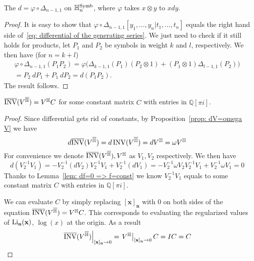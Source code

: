 \begin{lemma}\label{lem: differential = Delta_{d-1,1}} The $d=\varphi\circ\Delta_{n-1,1}$ on $\mathbb H^{\operatorname{Symb}}_n$, where $\varphi$ takes $x\otimes y$ to $xdy$.
\end{lemma}

\begin{proof} It is easy to show that $\varphi\circ\Delta_{n-1,1}[y_1,\dots,y_n|t_1,\dots,t_n]$ equals the right hand side of~\eqref{eq: differential of the generating series}. We just need to check if it still holds for products, let $P_1$ and $P_2$ be symbols in weight  $k$ and $l$, respectively. We then have (for $n=k+l$)
\begin{multline}
\varphi\circ\Delta_{n-1,1}(P_1 P_2)=\varphi\big(\Delta_{k-1,1}(P_1)(P_2\otimes 1)+(P_1\otimes 1)\Delta_{l-1,1}(P_2)\big)\\
=P_2~d P_1+P_1~d P_2=d (P_1P_2).
\end{multline}
The result follows. 
\end{proof}

\begin{theorem}\label{thm: V^{Hbar} = V^{H}C}
$\overline{\operatorname{INV}}(V^{\overline{\mathbb H}})=V^{\mathbb H}C$ for some constant matrix $C$ with entries in $\mathbb Q[\pi i]$.
\end{theorem}

\begin{proof}
Since differential gets rid of constants, by Proposition~\ref{prop: dV=omega V}  we have
\[
d\overline{\operatorname{INV}}(V^{\overline{\mathbb H}})=d\operatorname{INV}(V^{\overline{\mathbb H}})=dV^{\mathbb H}=\omega V^{\mathbb H}
\]
For convenience we denote $\overline{\operatorname{INV}}(V^{\overline{\mathbb H}}), V^{\mathbb H}$ as $V_1, V_2$ respectively. We then have
\begin{equation*}
d(V_2^{-1}V_1)=-V_2^{-1}(dV_2)V_2^{-1}V_1+V_2^{-1}(dV_1)=-V_2^{-1}\omega V_2V_2^{-1}V_1+V_2^{-1}\omega V_1=0
\end{equation*}
Thanks to Lemma~\ref{lem: df=0 => f=const} we know $V_2^{-1}V_1$ equals to some constant matrix $C$ with entries in $\mathbb Q[\pi i]$.

We can evaluate $C$ by simply replacing $[\mathbf x]_{\mathbf n}$ with 0 on both sides of the equation $\overline{\operatorname{INV}}(V^{\overline{\mathbb H}})=V^{\mathbb H}C$. This corresponds to evaluating the regularized values of $\operatorname{Li}_{\mathbf n}(\mathbf x)$, $\log(x)$ at the origin. As a result
\[
\left.\overline{\operatorname{INV}}(V^{\overline{\mathbb H}})\right|_{[\mathbf x]_{\mathbf n}\to 0}=\left.V^{\mathbb H}\right|_{[\mathbf x]_{\mathbf n}\to 0}C=IC=C
\]
\end{proof}

